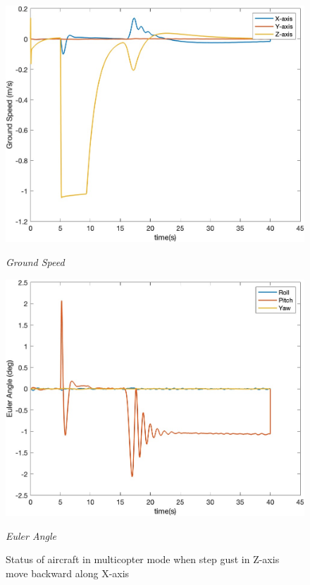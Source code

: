 \begin{figure}[htbp]
  \begin{minipage}[b]{0.45\textwidth}
    \centering
    \includegraphics[width=\textwidth]{Images/Gust/VTOL step/3 groundspeed_4.jpg}
    \caption*{\textit{Ground Speed}}
  \end{minipage}
  \hfil
  \begin{minipage}[b]{0.45\textwidth}
    \centering
    \includegraphics[width=\textwidth]{Images/Gust/VTOL step/4 EulerAngle_4.jpg}
    \caption*{\textit{Euler Angle}}
  \end{minipage}
  \caption{Status of aircraft in multicopter mode when step gust in Z-axis move backward along X-axis}
  \label{fig:VTOL step z}
\end{figure}


